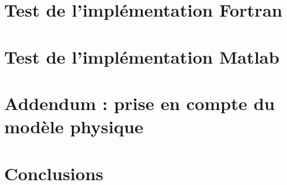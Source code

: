 \documentclass[a4paper,12pt]{article}
\begin{document}
\section{Test de l'implémentation Fortran}

\section{Test de l'implémentation Matlab}

\section{Addendum : prise en compte du modèle physique}

\section{Conclusions}
\end{document}
